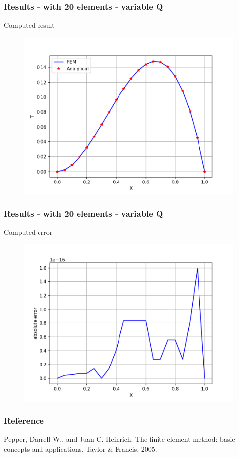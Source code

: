 \begin{frame}
	\frametitle{Results - with 20 elements - variable Q}
	Computed result
	\begin{figure}
		\includegraphics[scale=0.5]{supportingFiles/results_variableQ/output_10.png}
	\end{figure}
\end{frame}

\begin{frame}
	\frametitle{Results - with 20 elements - variable Q}
	Computed error
	\begin{figure}
		\includegraphics[scale=0.5]{supportingFiles/results_variableQ/error_10.png}
	\end{figure}
\end{frame}


\begin{frame}
	\frametitle{Reference}
Pepper, Darrell W., and Juan C. Heinrich. The finite element method: basic concepts and applications. Taylor \& Francis, 2005.
\end{frame}
